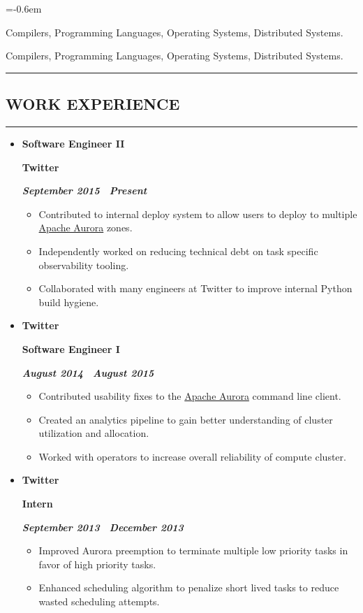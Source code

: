 \documentclass[10pt,letterpaper]{article}
\newcommand\textbox[1]{%
  \parbox{.333\textwidth}{#1}%
}
\newcommand{\sectionTitle}[1]{
  \hrule
  \vspace{-1.0em} 
  \subsection*{\uppercase{\textbf{#1}}}
  \vspace{-0.3em}
    \hrule
    \vspace{0.5em}  
}
\newcommand{\titleExperienceWithoutLocation}[4]{
  \vspace{1.0em}
  \item[]
  {
    \textbox{\textbf{#1}\hfill}\textbox{\hfil \textbf{#2}\hfil}\hfill \textbf{\emph{#3 \textendash \ #4}}
  }
}
\begin{document}
  \begin{description}[labelindent=\parindent]
    \parskip=-0.6em
    \item [Graduate Coursework:] Compilers, Programming Languages, Operating Systems, Distributed Systems.
    \item [Undergraduated Coursework:] Compilers, Programming Languages, Operating Systems, Distributed Systems.
  \end{description}
  
  \sectionTitle{Work Experience}
  \begin{itemize}[leftmargin=*]
    \parskip=-0.6em
    
  \titleExperienceWithoutLocation{Software Engineer II}{Twitter}{September 2015}{Present}
    \begin{itemize}[label=\textbullet]
      \itemsep0em
      \item Contributed to internal deploy system to allow users to deploy to
      multiple \href{aurora.apache.org}{Apache Aurora} zones.
      \item Independently worked on reducing technical debt on task specific
      observability tooling.
      \item Collaborated with many engineers at Twitter to improve internal
      Python build hygiene.
    \end{itemize}
    
  \titleExperienceWithoutLocation{Twitter}{Software Engineer I}{August 2014}{August 2015}
    \begin{itemize}[label=\textbullet]
      \itemsep0em
      \item Contributed usability fixes to the
      \href{aurora.apache.org}{Apache Aurora} command line client.
      \item Created an analytics pipeline to gain better understanding of
      cluster utilization and allocation.
      \item Worked with operators to increase overall reliability of compute
      cluster.
    \end{itemize}
    
  \titleExperienceWithoutLocation{Twitter}{Intern}{September 2013}{December 2013}
    \begin{itemize}[label=\textbullet]
      \itemsep0em
      \item Improved Aurora preemption to terminate multiple low priority tasks
      in favor of high priority tasks.
      \item Enhanced scheduling algorithm to penalize short lived tasks to
      reduce wasted scheduling attempts.
    \end{itemize}
    

\end{itemize}
\end{document}

